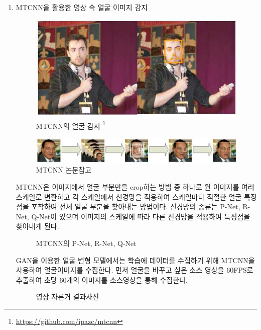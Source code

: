 \documentclass{oblivoir}
\begin{document}
\begin{enumerate}
    
    \item MTCNN을 활용한 영상 속 얼굴 이미지 감지


    \begin{figure}[h!]
      \centering
        \includegraphics{pic/chp5/img881}
      \caption{MTCNN의 얼굴 감지 \protect\footnote{\protect\url {https://github.com/ipazc/mtcnn}}}
    \end{figure}

    \begin{figure}[h!]
      \centering
        \includegraphics{pic/chp5/img882}
      \caption{MTCNN 논문참고}
    \end{figure}



    MTCNN은 이미지에서 얼굴 부분만을 crop하는 방법 중 하나로 원 이미지를 여러 스케일로 변환하고 각 스케일에서 신경망을 적용하여 스케일마다 적절한 얼굴 특징점을 포착하여 전체 얼굴 부분을 찾아내는 방법이다. 신경망의 종류는 P-Net, R-Net, Q-Net이 있으며 이미지의 스케일에 따라 다른 신경망을 적용하여 특징점을 찾아내게 된다.

    \begin{figure}[h!]
      \centering
      \caption{MTCNN의 P-Net, R-Net, Q-Net}
    \end{figure}


    GAN을 이용한 얼굴 변형 모델에서는 학습에 데이터를 수집하기 위해 MTCNN을 사용하여 얼굴이미지를 수집한다. 먼저 얼굴을 바꾸고 싶은 소스 영상을 60FPS로 추출하여 초당 60개의 이미지를 소스영상을 통해 수집한다.

    \begin{figure}[h!]%
    \centering
    \caption{영상 자른거 결과사진}
    \end{figure}



\end{enumerate}
\end{document}
